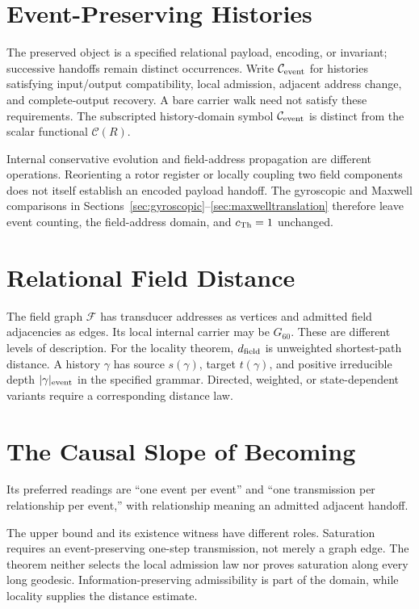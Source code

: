 \section{Event-Preserving Histories}\label{sec:eventpreserving}

The preserved object is a specified relational payload, encoding, or invariant; successive handoffs remain distinct occurrences. Write $\mathcal C_{\rm event}$ for histories satisfying input/output compatibility, local admission, adjacent address change, and complete-output recovery. A bare carrier walk need not satisfy these requirements. The subscripted history-domain symbol $\mathcal C_{\rm event}$ is distinct from the scalar functional $\mathcal C(R)$.


Internal conservative evolution and field-address propagation are different operations. Reorienting a rotor register or locally coupling two field components does not itself establish an encoded payload handoff. The gyroscopic and Maxwell comparisons in Sections~\ref{sec:gyroscopic}--\ref{sec:maxwelltranslation} therefore leave event counting, the field-address domain, and $c_{\mathrm{Th}}=1$ unchanged.

\section{Relational Field Distance}\label{sec:fielddistance}
The field graph $\mathcal F$ has transducer addresses as vertices and admitted field adjacencies as edges. Its local internal carrier may be $G_{60}$. These are different levels of description. For the locality theorem, $d_{\rm field}$ is unweighted shortest-path distance. A history $\gamma$ has source $s(\gamma)$, target $t(\gamma)$, and positive irreducible depth $|\gamma|_{\rm event}$ in the specified grammar. Directed, weighted, or state-dependent variants require a corresponding distance law.

\section{The Causal Slope of Becoming}\label{sec:causalslope}

Its preferred readings are ``one event per event'' and ``one transmission per relationship per event,'' with relationship meaning an admitted adjacent handoff.


The upper bound and its existence witness have different roles. Saturation requires an event-preserving one-step transmission, not merely a graph edge. The theorem neither selects the local admission law nor proves saturation along every long geodesic. Information-preserving admissibility is part of the domain, while locality supplies the distance estimate.

